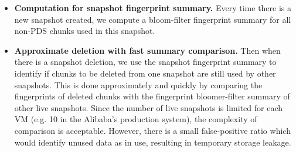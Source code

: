 \begin{itemize}
\item {\bf Computation for snapshot fingerprint summary.}
Every time there is a new snapshot created,
we compute a bloom-filter fingerprint summary for all non-PDS chunks used 
in this snapshot.

\item {\bf Approximate deletion with fast summary comparison.}
Then when there is a snapshot deletion, 
we use  the snapshot fingerprint summary to identify if  chunks to be deleted from one snapshot
are still used by other snapshots. 
This is done approximately and quickly by comparing the fingerprints of deleted chunks with
the fingerprint bloomer-filter summary of other live snapshots.
Since the number of live snapshots is limited for each VM (e.g. 10 in the Alibaba's production system), 
the complexity of comparison is acceptable.
However, there is a small false-positive ratio which
would identify unused data as in use, resulting in temporary storage leakage.


\end{itemize}
